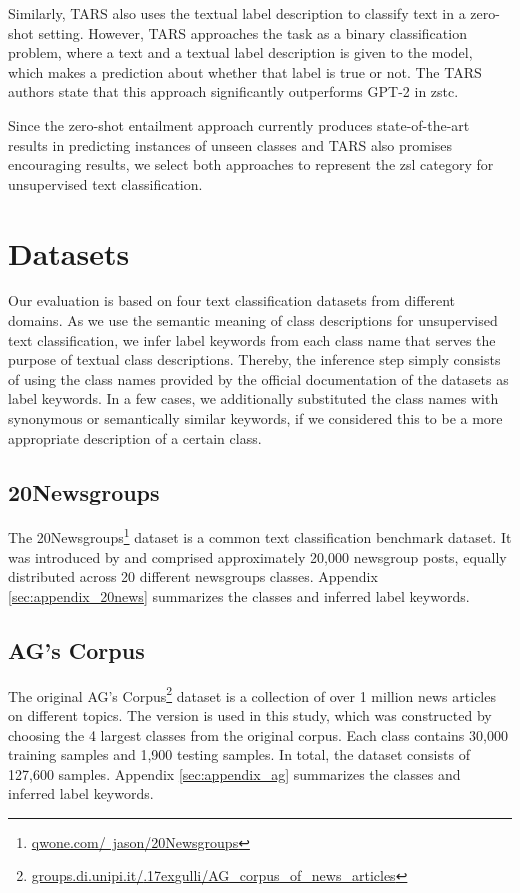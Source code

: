 \documentclass[sigconf]{acmart}
\begin{document}
Similarly, TARS \cite{halder-etal-2020-task} also uses the textual label description to classify text in a zero-shot setting. However, TARS approaches the task as a binary classification problem, where a text and a textual label description is given to the model, which makes a prediction about whether that label is true or not. The TARS authors state that this approach significantly outperforms GPT-2 \cite{Radford2019LanguageMA} in \ac{zstc}.

Since the zero-shot entailment approach currently produces state-of-the-art results in predicting instances of unseen classes and TARS also promises encouraging results, we select both approaches to represent the \ac{zsl} category for unsupervised text classification.


\section{Datasets}\label{sec:datasets}

Our evaluation is based on four text classification datasets from different domains. As we use the semantic meaning of class descriptions for unsupervised text classification, we infer label keywords from each class name that serves the purpose of textual class descriptions. Thereby, the inference step simply consists of using the class names provided by the official documentation of the datasets as label keywords. In a few cases, we additionally substituted the class names with synonymous or semantically similar keywords, if we considered this to be a more appropriate description of a certain class.

\subsection{20Newsgroups}\label{sec:20news}
The 20Newsgroups\footnote{\href{http://qwone.com/~jason/20Newsgroups}{qwone.com/~jason/20Newsgroups}} dataset is a common text classification benchmark dataset. It was introduced by \citet{Lang95} and comprised approximately 20,000 newsgroup posts, equally distributed across 20 different newsgroups classes. Appendix \ref{sec:appendix_20news} summarizes the classes and inferred label keywords.

\subsection{AG's Corpus}\label{sec:agcorpus}
The original AG's Corpus\footnote{\href{http://groups.di.unipi.it/~gulli/AG_corpus_of_news_articles}{groups.di.unipi.it/{\raise.17ex\hbox{}}gulli/AG\_corpus\_of\_news\_articles}} dataset is a collection of over 1 million news articles on different topics. The \citet{10.5555/2969239.2969312} version is used in this study, which was constructed by choosing the 4 largest classes from the original corpus. Each class contains 30,000 training samples and 1,900 testing samples. In total, the dataset consists of 127,600 samples. Appendix \ref{sec:appendix_ag} summarizes the classes and inferred label keywords.
\end{document}
